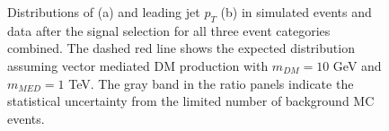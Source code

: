 \begin{figure}[hbtp]\begin{center}
 \caption{
   Distributions of \ETm (a) and leading jet $p_{T}$ (b) in simulated events and data after the signal selection for all three
   event categories combined. The dashed red line shows the expected distribution assuming vector mediated DM production with $m_{DM}=10$ GeV and $m_{MED}=1$ TeV.
   The gray band in the ratio panels indicate the statistical uncertainty from the limited number of background MC events.
 }
 \label{fig:ptandmet}\end{center}\end{figure}


